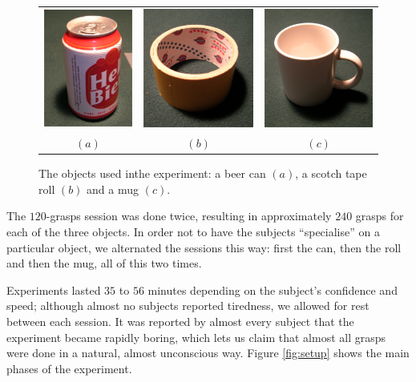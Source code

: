 \begin{figure}[htbp]
  \begin{center}
    \begin{tabular}{ccc}
      \includegraphics[width=0.3\linewidth]{beer.eps} &
      \includegraphics[width=0.3\linewidth]{scotch.eps}  &
      \includegraphics[width=0.3\linewidth]{mug.eps} \\
      $(a)$ & $(b)$ & $(c)$
    \end{tabular}
    \caption{The objects used inthe experiment: a beer can $(a)$, a scotch
    tape roll $(b)$ and a mug $(c)$.}
    \label{fig:objects}
  \end{center}
\end{figure}

The $120$-grasps session was done twice, resulting in approximately
$240$ grasps for each of the three objects. In order not to have the
subjects ``specialise'' on a particular object, we alternated the
sessions this way: first the can, then the roll and then the mug, all
of this two times.

Experiments lasted $35$ to $56$ minutes depending on the subject's
confidence and speed; although almost no subjects reported tiredness,
we allowed for rest between each session. It was reported by almost
every subject that the experiment became rapidly boring, which lets us
claim that almost all grasps were done in a natural, almost
unconscious way. Figure \ref{fig:setup} shows the main phases of the
experiment.

